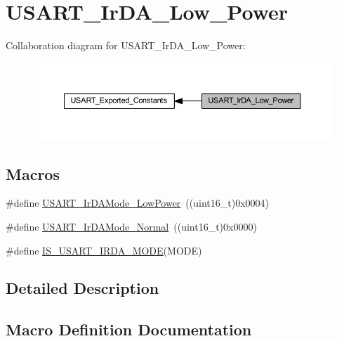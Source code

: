 \hypertarget{group___u_s_a_r_t___ir_d_a___low___power}{}\section{U\+S\+A\+R\+T\+\_\+\+Ir\+D\+A\+\_\+\+Low\+\_\+\+Power}
\label{group___u_s_a_r_t___ir_d_a___low___power}
Collaboration diagram for U\+S\+A\+R\+T\+\_\+\+Ir\+D\+A\+\_\+\+Low\+\_\+\+Power\+:
\nopagebreak
\begin{figure}[H]
\begin{center}
\leavevmode
\includegraphics[width=350pt]{group___u_s_a_r_t___ir_d_a___low___power}
\end{center}
\end{figure}
\subsection*{Macros}
\begin{DoxyCompactItemize}
\item 
\#define \hyperlink{group___u_s_a_r_t___ir_d_a___low___power_ga00c2635d0e6ca1a5b158f1c1673e862f}{U\+S\+A\+R\+T\+\_\+\+Ir\+D\+A\+Mode\+\_\+\+Low\+Power}~((uint16\+\_\+t)0x0004)
\item 
\#define \hyperlink{group___u_s_a_r_t___ir_d_a___low___power_ga796cd5451deb896741206986bd6d03e6}{U\+S\+A\+R\+T\+\_\+\+Ir\+D\+A\+Mode\+\_\+\+Normal}~((uint16\+\_\+t)0x0000)
\item 
\#define \hyperlink{group___u_s_a_r_t___ir_d_a___low___power_ga7790838ff8ee71089da2c0e5bceee569}{I\+S\+\_\+\+U\+S\+A\+R\+T\+\_\+\+I\+R\+D\+A\+\_\+\+M\+O\+DE}(M\+O\+DE)
\end{DoxyCompactItemize}


\subsection{Detailed Description}


\subsection{Macro Definition Documentation}
\mbox{\label{group___u_s_a_r_t___ir_d_a___low___power_ga7790838ff8ee71089da2c0e5bceee569}} 
